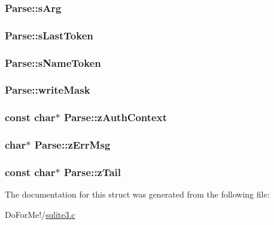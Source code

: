 \hypertarget{struct_parse_aa3fe38b31dd1cd0fbea4de0e77891642}{
\subsubsection[{s\-Arg}]{ Parse\-::s\-Arg}}\label{struct_parse_aa3fe38b31dd1cd0fbea4de0e77891642}
\hypertarget{struct_parse_ad499020d1bf06f3c98c8d36e2ceb83fd}{
\subsubsection[{s\-Last\-Token}]{ Parse\-::s\-Last\-Token}}\label{struct_parse_ad499020d1bf06f3c98c8d36e2ceb83fd}
\hypertarget{struct_parse_afd929c54566cfc4d6f748fcc6b79b973}{
\subsubsection[{s\-Name\-Token}]{ Parse\-::s\-Name\-Token}}\label{struct_parse_afd929c54566cfc4d6f748fcc6b79b973}
\hypertarget{struct_parse_a4939b6d4fd3f48731b58b8a6f51417cd}{
\subsubsection[{write\-Mask}]{ Parse\-::write\-Mask}}\label{struct_parse_a4939b6d4fd3f48731b58b8a6f51417cd}
\hypertarget{struct_parse_a12c6e2fb69848bcc57169d44993c351f}{
\subsubsection[{z\-Auth\-Context}]{\setlength{\rightskip}{0pt plus 5cm}const char$\ast$ Parse\-::z\-Auth\-Context}}\label{struct_parse_a12c6e2fb69848bcc57169d44993c351f}
\hypertarget{struct_parse_a04146757986ff4654c7b321654896e81}{
\subsubsection[{z\-Err\-Msg}]{\setlength{\rightskip}{0pt plus 5cm}char$\ast$ Parse\-::z\-Err\-Msg}}\label{struct_parse_a04146757986ff4654c7b321654896e81}
\hypertarget{struct_parse_a14f58728b3ae2a297272510ae4bd9a89}{
\subsubsection[{z\-Tail}]{\setlength{\rightskip}{0pt plus 5cm}const char$\ast$ Parse\-::z\-Tail}}\label{struct_parse_a14f58728b3ae2a297272510ae4bd9a89}


The documentation for this struct was generated from the following file\-:\begin{DoxyCompactItemize}
\item 
Do\-For\-Me!/\hyperlink{sqlite3_8c}{sqlite3.\-c}\end{DoxyCompactItemize}
